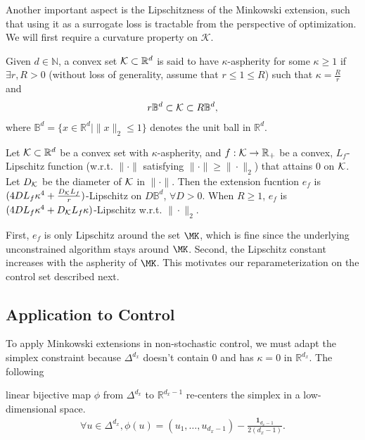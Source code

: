Another important aspect is the Lipschitzness of the Minkowski extension, such that using it as a surrogate loss is tractable from the perspective of optimization. We will first require a curvature property on $\mathcal{K}$.

\begin{definition} 
\label{def:aspherity}
Given $d\in\mathbb{N}$, a convex set $\mathcal{K}\subset\mathbb{R}^d$ is said to have $\kappa$-aspherity for some $\kappa\ge 1$ if $\exists r, R>0$ (without loss of generality, assume that $r\le 1\le R$) such that $\kappa=\frac{R}{r}$ and
\begin{align*}
r\mathbb{B}^d\subset\mathcal{K}\subset R\mathbb{B}^d, 
\end{align*}
where $\mathbb{B}^d=\{x\in\mathbb{R}^d\mid \|x\|_2\le 1\}$ denotes the unit ball in $\mathbb{R}^d$.  
\end{definition}

\begin{lemma} 
\label{lem:extension-lip}
Let $\mathcal{K}\subset\mathbb{R}^d$ be a convex set with $\kappa$-aspherity, and $f:\mathcal{K}\rightarrow\mathbb{R}_+$ be a convex, $L_f$-Lipschitz function (w.r.t. $\|\cdot\|$ satisfying $\|\cdot\|\ge \|\cdot\|_2$) that attains $0$ on $\mathcal{K}$. Let $D_{\mathcal{K}}$ be the diameter of $\mathcal{K}$ in $\|\cdot\|$.  Then the extension fucntion $e_f$ is $(4DL_f\kappa^4+\frac{D_{\mathcal{K}}L_f}{r})$-Lipschitz on $D\mathbb{B}^d$, $\forall D>0$. When $R\ge 1$, $e_f$ is $(4DL_f\kappa^4+D_{\mathcal{K}}L_f\kappa)$-Lipschitz w.r.t. $\|\cdot\|_2$.
\end{lemma}

First, $e_f$ is only Lipschitz around the set $\MK$, which is fine since the underlying unconstrained algorithm stays around $\MK$. Second, the Lipschitz constant increases with the aspherity of $\MK$. This motivates our reparameterization on the control set described next.

\subsection{Application to Control}\label{sec:control-using-minkowski}
To apply Minkowski extensions in non-stochastic control, we must adapt the simplex constraint because $\Delta^{d_x}$ doesn't contain 0 and has $\kappa=0$ in $\mathbb{R}^{d_x}$. The following


 linear bijective map $\phi$ from $\Delta^{d_x}$ to $\mathbb{R}^{d_x-1}$ re-centers the simplex in a low-dimensional space.
\begin{align}
\label{eq:phi-func}
    \forall u\in\Delta^{d_x}, \phi(u)= (u_1,\dots,u_{d_x-1})-\frac{\mathbf{1}_{d_x-1}}{2(d_x-1)}.
\end{align}

